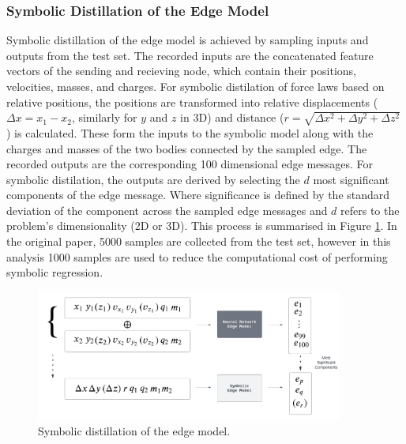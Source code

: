\documentclass[11pt]{article}
\begin{document}
\subsubsection{Symbolic Distillation of the Edge Model}
Symbolic distillation of the edge model is achieved by sampling inputs and outputs from the test set. The recorded inputs are the concatenated feature vectors of the sending and recieving node, which contain their positions, velocities, masses, and charges. For symbolic distilation of force laws based on relative positions, the positions are transformed into relative displacements ($\Delta x = x_1 - x_2$, similarly for $y$ and $z$ in 3D) and distance ($r = \sqrt{\Delta x^2 + \Delta y^2 + \Delta z^2}$) is calculated. These form the inputs to the symbolic model along with the charges and masses of the two bodies connected by the sampled edge. The recorded outputs are the corresponding 100 dimensional edge messages. For symbolic distilation, the outputs are derived by selecting the $d$ most significant components of the edge message. Where significance is defined by the standard deviation of the component across the sampled edge messages and $d$ refers to the problem's dimensionality (2D or 3D). This process is summarised in Figure \ref{fig:edge_model_symbolic_distillation}. In the original paper, 5000 samples are collected from the test set, however in this analysis 1000 samples are used to reduce the computational cost of performing symbolic regression.

\begin{figure}[H]
    \centering
    \includegraphics[width=0.9\textwidth]{figs/edge_distillation.png}
    \caption{Symbolic distillation of the edge model.}
    \label{fig:edge_model_symbolic_distillation}
\end{figure}
\end{document}

